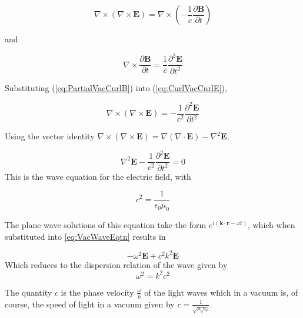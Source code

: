 \documentclass[twocolumn]{article}
\begin{document}
\begin{equation}
	\label{eq:CurlVacCurlE}
	\nabla \times ( \nabla \times \mathbf{E}) = \nabla \times (-\frac{1}{c} \frac{\partial \mathbf{B}}{\partial t}) 
\end{equation}
\begin{center}
	and
\end{center}
\begin{equation}
	\label{eq:PartialVacCurlB}
	\nabla \times \frac{\partial \mathbf{B}}{\partial t} = \frac{1}{c} \frac{\partial^2 \mathbf{E}}{\partial t^2}
\end{equation}

Substituting (\ref{eq:PartialVacCurlB}) into (\ref{eq:CurlVacCurlE}),

\begin{equation}
	\nabla \times ( \nabla \times \mathbf{E}) = -\frac{1}{c^2} \frac{\partial^2 \mathbf{E}}{\partial t^2} 
\end{equation}

Using the vector identity $\nabla \times (\nabla \times \mathbf{E}) = \nabla(\nabla \cdot \mathbf{E}) - \nabla^2\mathbf{E}$,

\begin{equation}
	\label{eq:VacWaveEqtn}
	\nabla^2\mathbf{E} - \frac{1}{c^2} \frac{\partial^2 \mathbf{E}}{\partial t^2} = 0
\end{equation}
This is the wave equation for the electric field, with

\begin{equation}
	c^2 = \frac{1}{\epsilon_0 \mu_0}
\end{equation}

The plane wave solutions of this equation take the form $e^{i(\mathbf{k} \cdot \mathbf{r} - \omega t)}$, which when substituted into \ref{eq:VacWaveEqtn} results in

\begin{equation}
	-\omega^2\mathbf{E} + c^2k^2\mathbf{E}
\end{equation}
Which reduces to the dispersion relation of the wave given by
\begin{equation}
	\omega^2 = k^2c^2
\end{equation}

The quantity $c$ is the phase velocity $\frac{\omega}{k}$ of the light waves which in a vacuum is, of course, the speed of light in a vacuum given by $c = \frac{1}{\sqrt{\mu_0\epsilon_0}}$.
\end{document}
